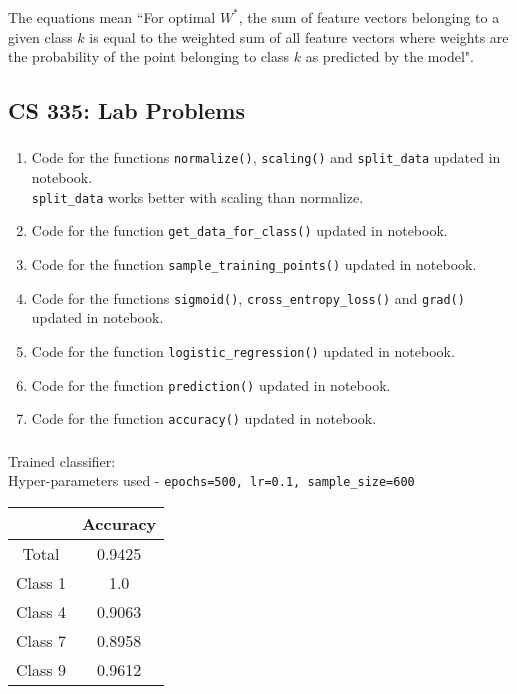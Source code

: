 \documentclass[12pt, fleqn]{article}
\begin{document}
\subsubsection{}
The equations mean ``For optimal $W^*$, the sum of feature vectors belonging to a given class $k$ is equal to the weighted sum of all feature vectors where weights are the probability of the point belonging to class $k$ as predicted by the model".


\newpage
\subsection{CS 335: Lab Problems}
\subsubsection{}
\begin{enumerate}[label=(\roman*)]
  \item Code for the functions \verb!normalize()!, \verb!scaling()! and \verb!split_data! updated in notebook. \\
        \verb!split_data! works better with scaling than normalize.
  \item Code for the function \verb!get_data_for_class()! updated in notebook.
  \item Code for the function \verb!sample_training_points()! updated in notebook.
  \item Code for the functions \verb!sigmoid()!, \verb!cross_entropy_loss()! and \verb!grad()! updated in notebook.
  \item Code for the function \verb!logistic_regression()! updated in notebook.
  \item Code for the function \verb!prediction()! updated in notebook.
  \item Code for the function \verb!accuracy()! updated in notebook.
\end{enumerate}

\subsubsection{}
Trained classifier: \\
Hyper-parameters used - \texttt{epochs=500, lr=0.1, sample\_size=600} \\
\begin{tabular}{|c||c||}
  \hline
          & Accuracy \\
  \hline
  Total   & 0.9425   \\
  Class 1 & 1.0      \\
  Class 4 & 0.9063   \\
  Class 7 & 0.8958   \\
  Class 9 & 0.9612   \\
  \hline
\end{tabular} \\
\end{document}
